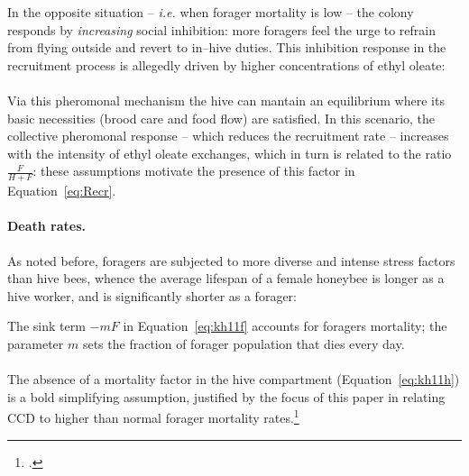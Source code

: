 In the opposite situation -- \emph{i.e.} when forager mortality is low -- the colony responds by \emph{increasing} social inhibition: more foragers feel the urge to refrain from flying outside and revert to in--hive duties.
This inhibition response in the recruitment process is allegedly driven by higher concentrations of ethyl oleate:

\paragraph{}
Via this pheromonal mechanism the hive can mantain an equilibrium where its basic necessities (brood care and food flow) are satisfied.
In this scenario, the collective pheromonal response -- which reduces the recruitment rate -- increases with the intensity of ethyl oleate exchanges, which in turn is related to the ratio $\frac{F}{H+F}$: these assumptions motivate the presence of this factor in Equation~\eqref{eq:Recr}.


\paragraph{Death rates.}
As noted before, foragers are subjected to more diverse and intense stress factors than hive bees, whence the average lifespan of a female honeybee is longer as a hive worker, and is significantly shorter as a forager: 

The sink term $-mF$ in Equation~\eqref{eq:kh11f} accounts for foragers mortality;
the parameter $m$ sets the fraction of forager population that dies every day.

\paragraph{}
The absence of a mortality factor in the hive compartment (Equation~\eqref{eq:kh11h}) is a bold simplifying assumption,
justified by the focus of this paper in relating CCD to higher than normal forager mortality rates.\footcite[1,2,3,5]{khoury2011}


